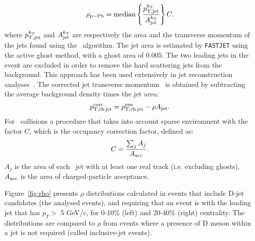 \begin{equation}
\label{eq_rho_pPB}
\rho_{\rm p-Pb} = {\rm median}\left\{\frac{p_{\rm T,jet}^{k_{\mathrm{T}}}}{A_{\rm jet}^{k_{\mathrm{T}}}}\right\} C.
\end{equation}
where $p_{\rm T,jet}^{k_{\mathrm{T}}}$ and $A_{\rm jet}^{k_{\mathrm{T}}}$ are respectively the area and the transverse momentum of
the jets found using the \kt\ algorithm. 
The jet area is estimated by \texttt{FASTJET} using the active ghost method, with a ghost area of $0.005$.
The two leading jets in the event are excluded in order to remove the hard scattering jets from the background.
This approach has been used extensively in jet reconstruction analyses~\cite{ALICE:2014a, ALICE:2015a}.
The corrected jet transverse momentum \ptchjetcorr\ is obtained by subtracting the average background density times the jet area:
\begin{equation}
\label{eq_jet_backsub}
p_{\mathrm{T,ch\,jet}}^{\mathrm{corr}} = p_{\mathrm{T,ch\,jet}}^{\mathrm{raw}} - \rho A_{\rm jet}.
\end{equation}
For \pPb\ collisions a procedure that takes into account sparse environment with the factor $C$, which is the occupancy correction factor, defined as:
\begin{equation}
\label{eq_Cfac}
C = \frac{\sum_{j}A_{j}}{A_{\rm acc}}.
\end{equation}
$A_{j}$ is the area of each \kt\ jet with at least one real track (i.e. excluding ghosts), $A_{\rm acc}$ is the area of charged-particle acceptance.

Figure~\ref{fig:rho} presents $\rho$ distributions calculated in events that include D-jet candidates (the analysed events), and requiring that an event is with the leading jet that has $p_{T}>$ 5 GeV/$c$, for 0-10\% (left) and 20-40\% (right) centrality. The distributions are compared to $\rho$ from events where a presence of D meson within a jet is not required (called inclusive-jet events).

